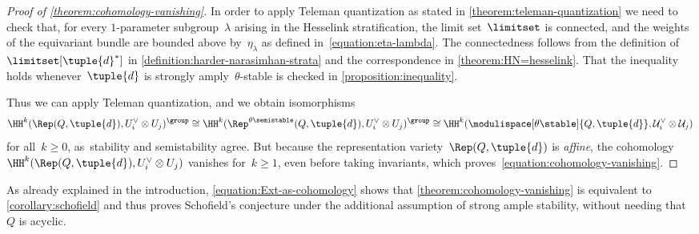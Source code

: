 \begin{proof}[Proof of \cref{theorem:cohomology-vanishing}]
In order to apply Teleman quantization
as stated in \cref{theorem:teleman-quantization}
we need to check that,
for every $1$-parameter subgroup~$\lambda$
arising in the Hesselink stratification,
the limit set~$\limitset$ is connected,
and the weights of the equivariant bundle are bounded above by~$\eta_\lambda$ as defined in~\eqref{equation:eta-lambda}.
The connectedness follows from the definition of~$\limitset[{\tuple{d}^*}]$
in \cref{definition:harder-narasimhan-strata}
and the correspondence in \cref{theorem:HN=hesselink}.
That the inequality holds whenever~$\tuple{d}$ is strongly amply~$\theta$-stable
is checked in \cref{proposition:inequality}.

Thus we can apply Teleman quantization,
and we obtain isomorphisms
\begin{equation*}
\HH^k(\Rep(Q,\tuple{d}),U_i^\vee\otimes U_j)^{\group}
\cong
\HH^k(\Rep^{\theta\semistable}(Q,\tuple{d}),U_i^\vee\otimes U_j)^{\group}
\cong
\HH^k(\modulispace[\theta\stable]{Q,\tuple{d}},\mathcal{U}_i^\vee\otimes\mathcal{U}_j)
\end{equation*}
for all~$k\geq 0$, as~stability and semistability agree.
But because the representation variety~$\Rep(Q,\tuple{d})$ is \emph{affine},
the cohomology~$\HH^k(\Rep(Q,\tuple{d}),U_i^\vee\otimes U_j)$ vanishes for~$k\geq 1$,
even before taking invariants,
which proves~\eqref{equation:cohomology-vanishing}.
\end{proof}

As already explained in the introduction,
\eqref{equation:Ext-as-cohomology} shows that \cref{theorem:cohomology-vanishing}
is equivalent to \cref{corollary:schofield}
and thus proves Schofield's conjecture
under the additional assumption of strong ample stability,
without needing that~$Q$ is acyclic.

